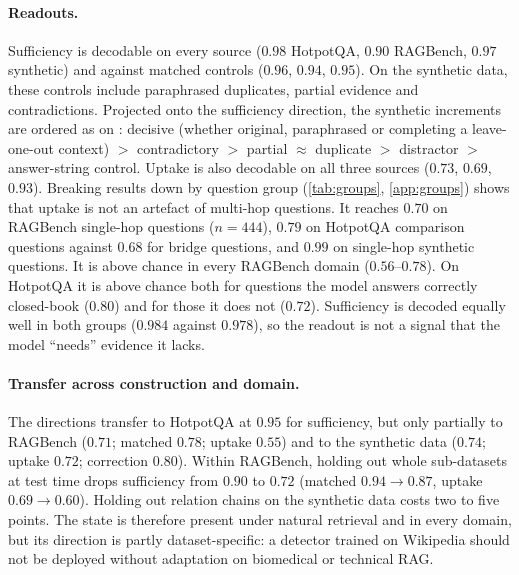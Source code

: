 \begin{table}[t]
\centering\scriptsize
\setlength{\tabcolsep}{2.5pt}

\caption{External validity (Qwen2.5-7B). Within-dataset probes trained and tested on the row's dataset; \musique{} 2-hop directions applied without retraining; and the patching and projection-out tests of \cref{sec:causal} (answered rate, 150 held-out questions). ``Held-out sub-datasets'' and ``held-out relation chains'' test on groups never seen in training.}
\label{tab:external}
\end{table}

\paragraph{Readouts.}
Sufficiency is decodable on every source ($0.98$ HotpotQA, $0.90$ RAGBench, $0.97$ synthetic) and against matched controls ($0.96$, $0.94$, $0.95$). On the synthetic data, these controls include paraphrased duplicates, partial evidence and contradictions. Projected onto the sufficiency direction, the synthetic increments are ordered as on \musique{}: decisive (whether original, paraphrased or completing a leave-one-out context) $>$ contradictory $>$ partial $\approx$ duplicate $>$ distractor $>$ answer-string control. Uptake is also decodable on all three sources ($0.73$, $0.69$, $0.93$). Breaking results down by question group (\cref{tab:groups}, \cref{app:groups}) shows that uptake is not an artefact of multi-hop questions. It reaches $0.70$ on RAGBench single-hop questions ($n{=}444$), $0.79$ on HotpotQA comparison questions against $0.68$ for bridge questions, and $0.99$ on single-hop synthetic questions. It is above chance in every RAGBench domain ($0.56$--$0.78$). On HotpotQA it is above chance both for questions the model answers correctly closed-book ($0.80$) and for those it does not ($0.72$). Sufficiency is decoded equally well in both groups ($0.984$ against $0.978$), so the readout is not a signal that the model ``needs'' evidence it lacks.

\paragraph{Transfer across construction and domain.}
The \musique{} directions transfer to HotpotQA at $0.95$ for sufficiency, but only partially to RAGBench ($0.71$; matched $0.78$; uptake $0.55$) and to the synthetic data ($0.74$; uptake $0.72$; correction $0.80$). Within RAGBench, holding out whole sub-datasets at test time drops sufficiency from $0.90$ to $0.72$ (matched $0.94\to0.87$, uptake $0.69\to0.60$). Holding out relation chains on the synthetic data costs two to five points. The state is therefore present under natural retrieval and in every domain, but its direction is partly dataset-specific: a detector trained on Wikipedia should not be deployed without adaptation on biomedical or technical RAG.

